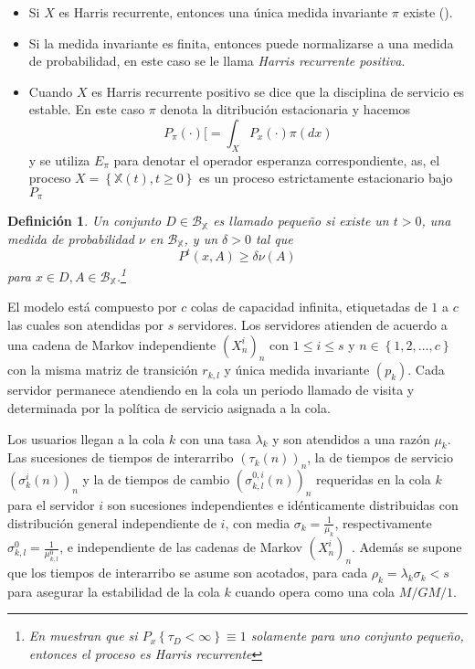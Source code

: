 \documentclass{article}
\newtheorem{Def}{Definición}
\begin{document}
\begin{itemize}
\item Si $X$ es Harris recurrente, entonces una \'unica medida
invariante $\pi$ existe (\cite{Getoor}). \item Si la medida
invariante es finita, entonces puede normalizarse a una medida de
probabilidad, en este caso se le llama {\em Harris recurrente
positiva}. \item Cuando $X$ es Harris recurrente positivo se dice
que la disciplina de servicio es estable. En este caso $\pi$
denota la ditribuci\'on estacionaria y hacemos
\[P_{\pi}\left(\cdot\right)[=\int_{X}P_{x}\left(\cdot\right)\pi\left(dx\right)\]
y se utiliza $E_{\pi}$ para denotar el operador esperanza
correspondiente, as, el proceso
$X=\left\{\mathbb{X}\left(t\right),t\geq0\right\}$ es un proceso
estrictamente estacionario bajo $P_{\pi}$
\end{itemize}

\begin{Def}
Un conjunto $D\in\mathcal{B}_\mathbb{X}$ es llamado peque\~no si
existe un $t>0$, una medida de probabilidad $\nu$ en
$\mathcal{B}_\mathbb{X}$, y un $\delta>0$ tal que
\[P^{t}\left(x,A\right)\geq\delta\nu\left(A\right)\] para $x\in
D,A\in\mathcal{B}_\mathbb{X}$.\footnote{En \cite{MeynTweedie}
muestran que si $P_{x}\left\{\tau_{D}<\infty\right\}\equiv1$
solamente para uno conjunto peque\~no, entonces el proceso es
Harris recurrente}
\end{Def}

El modelo est\'a compuesto por $c$ colas de capacidad infinita,
etiquetadas de $1$ a $c$ las cuales son atendidas por $s$
servidores. Los servidores atienden de acuerdo a una cadena de
Markov independiente $\left(X^{i}_{n}\right)_{n}$ con $1\leq i\leq
s$ y $n\in\left\{1,2,\ldots,c\right\}$ con la misma matriz de
transici\'on $r_{k,l}$ y \'unica medida invariante
$\left(p_{k}\right)$. Cada servidor permanece atendiendo en la
cola un periodo llamado de visita y determinada por la pol\'itica de
servicio asignada a la cola.

Los usuarios llegan a la cola $k$ con una tasa $\lambda_{k}$ y son
atendidos a una raz\'on $\mu_{k}$. Las sucesiones de tiempos de
interarribo $\left(\tau_{k}\left(n\right)\right)_{n}$, la de
tiempos de servicio
$\left(\sigma_{k}^{i}\left(n\right)\right)_{n}$ y la de tiempos de
cambio $\left(\sigma_{k,l}^{0,i}\left(n\right)\right)_{n}$
requeridas en la cola $k$ para el servidor $i$ son sucesiones
independientes e id\'enticamente distribuidas con distribuci\'on
general independiente de $i$, con media
$\sigma_{k}=\frac{1}{\mu_{k}}$, respectivamente
$\sigma_{k,l}^{0}=\frac{1}{\mu_{k,l}^{0}}$, e independiente de las
cadenas de Markov $\left(X^{i}_{n}\right)_{n}$. Adem\'as se supone
que los tiempos de interarribo se asume son acotados, para cada
$\rho_{k}=\lambda_{k}\sigma_{k}<s$ para asegurar la estabilidad de
la cola $k$ cuando opera como una cola $M/GM/1$.
\end{document}
